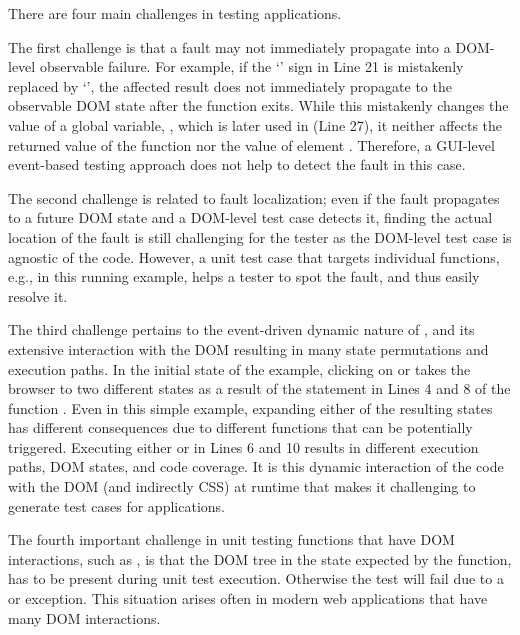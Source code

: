There are four main challenges in testing \javascript applications. 
 
The first challenge is that a fault may not immediately propagate into a DOM-level observable failure. %
For example, if the `\code{+}' sign in Line 21 is mistakenly replaced by `\code{-}', the affected result does not immediately propagate to the observable DOM state after the function exits. While this mistakenly changes the value of a global variable, , which is 
later used in   (Line 27), it neither affects the returned value of the  function nor the  value of element . Therefore, a GUI-level event-based testing approach does not help to detect the fault in this case.

The second challenge is related to fault localization; even if the fault propagates to a future DOM state and a DOM-level test case detects it, finding the actual location of the fault is still challenging for the tester as the DOM-level test case is agnostic of the \javascript code.
However, a unit test case that targets individual functions, e.g.,  in this running example, helps a tester to spot the fault, and thus easily resolve it. %

The third challenge pertains to the event-driven dynamic nature of \javascript, and its extensive interaction with the DOM  resulting in many state permutations and execution paths. In the initial state of the example, clicking on  or  takes the browser to two different states as a result of the  statement in Lines 4 and 8 of the function . 
Even in this simple example, expanding either of the resulting states has different consequences due to different functions that can be potentially triggered. 
Executing either  or  in Lines 6 and 10 results in different execution paths, DOM states, and code coverage. 
It is this dynamic interaction of the \javascript code with the DOM (and indirectly CSS) at runtime that makes it challenging to generate test cases for \javascript applications.  

The fourth important challenge in unit testing \javascript functions that have DOM interactions, such as , is that the DOM tree in the state expected by the function, has to be present during unit test execution. Otherwise the test will fail due to a  or  exception. This situation arises often in modern web applications that have many DOM interactions.
